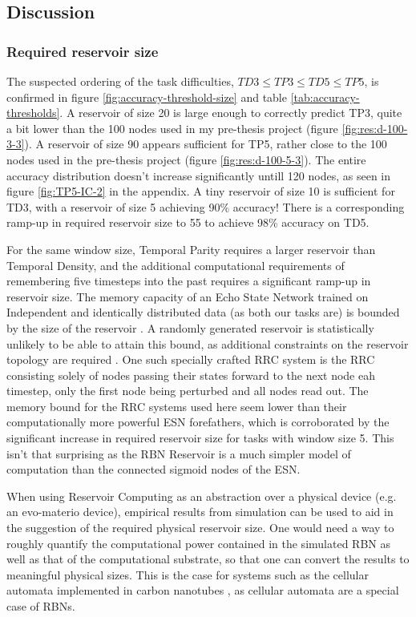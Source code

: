 \subsection{Discussion}

\subsubsection{Required reservoir size}

The suspected ordering of the task difficulties,
$ TD3 \leq TP3 \leq TD5 \leq TP5 $,
is confirmed in figure \ref{fig:accuracy-threshold-size} and table \ref{tab:accuracy-thresholds}.
A reservoir of size 20 is large enough to correctly predict TP3,
quite a bit lower than the 100 nodes used in my pre-thesis project (figure \ref{fig:res:d-100-3-3}).
A reservoir of size 90 appears sufficient for TP5, rather close to the 100 nodes used in the pre-thesis project (figure \ref{fig:res:d-100-5-3}).
The entire accuracy distribution doesn't increase significantly untill 120 nodes,
as seen in figure \ref{fig:TP5-IC-2} in the appendix.
A tiny reservoir of size 10 is sufficient for TD3,
with a reservoir of size 5 achieving 90\% accuracy!
There is a corresponding ramp-up in required reservoir size to 55 to achieve 98\% accuracy on TD5.

For the same window size, Temporal Parity requires a larger reservoir than Temporal Density,
and the additional computational requirements of remembering five timesteps into the past requires a significant ramp-up in reservoir size.
The memory capacity of an Echo State Network trained on Independent and identically distributed data (as both our tasks are) is bounded by the size of the reservoir \cite{Jaeger:2007}.
A randomly generated reservoir is statistically unlikely to be able to attain this bound,
as additional constraints on the reservoir topology are required \cite{Jaeger:2007}.
One such specially crafted RRC system is the RRC consisting solely of nodes passing their states forward to the next node eah timestep,
only the first node being perturbed and all nodes read out.
The memory bound for the RRC systems used here seem lower than their computationally more powerful ESN forefathers,
which is corroborated by the significant increase in required reservoir size for tasks with window size 5.
This isn't that surprising as the RBN Reservoir is a much simpler model of computation than the connected sigmoid nodes of the ESN.

When using Reservoir Computing as an abstraction over a physical device (e.g. an evo-materio device),
empirical results from simulation can be used to aid in the suggestion of the required physical reservoir size.
One would need a way to roughly quantify the computational power contained in the simulated RBN as well as that of the computational substrate,
so that one can convert the results to meaningful physical sizes.
This is the case for systems such as the cellular automata implemented in carbon nanotubes \cite{farstad2015evolving},
as cellular automata are a special case of RBNs.

